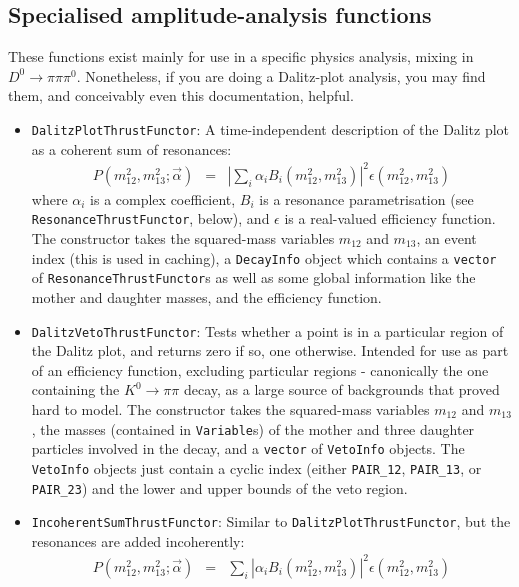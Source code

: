 \documentclass[12pt,pdflatex]{article}
\begin{document}
\subsection{Specialised amplitude-analysis functions}

These functions exist mainly for use in a specific
physics analysis, mixing in $D^0\to\pi\pi\pi^0$. Nonetheless, 
if you are doing a Dalitz-plot analysis, you may find them, and
conceivably even this documentation, helpful. 

\begin{itemize}
\item \texttt{DalitzPlotThrustFunctor}: A time-independent description
of the Dalitz plot as a coherent sum of resonances:
\begin{eqnarray}
P(m^2_{12},m^2_{13};\vec\alpha) &=& \left|\sum\limits_i \alpha_i B_i(m^2_{12},m^2_{13})\right|^2\epsilon(m^2_{12},m^2_{13})
\end{eqnarray}
where $\alpha_i$ is a complex coefficient, $B_i$ is a resonance parametrisation (see \texttt{ResonanceThrustFunctor}, below),
and $\epsilon$ is a real-valued efficiency function. The constructor takes the squared-mass variables $m_{12}$ and
$m_{13}$, an event index (this is used in caching), a \texttt{DecayInfo} object which contains a \texttt{vector}
of \texttt{ResonanceThrustFunctor}s as well as some global information like the mother and daughter masses, 
and the efficiency function. 
\item \texttt{DalitzVetoThrustFunctor}: Tests whether a point is in a particular 
region of the Dalitz plot, and returns zero if so, one otherwise. Intended for
use as part of an efficiency function, excluding particular regions - canonically
the one containing the  $K^0\to\pi\pi$ decay, as a large source of backgrounds that
proved hard to model. The constructor takes the squared-mass variables $m_{12}$ and
$m_{13}$, the masses (contained in \texttt{Variable}s) of the mother and three daughter
particles involved in the decay, and a \texttt{vector} of \texttt{VetoInfo} objects.
The \texttt{VetoInfo} objects just contain a cyclic index (either \texttt{PAIR\_12},
\texttt{PAIR\_13}, or \texttt{PAIR\_23}) and the lower and upper bounds of the veto region.
\item \texttt{IncoherentSumThrustFunctor}: Similar to \texttt{DalitzPlotThrustFunctor}, 
but the resonances are added incoherently:
\begin{eqnarray}
P(m^2_{12},m^2_{13};\vec\alpha) &=& \sum\limits_i \left|\alpha_i B_i(m^2_{12},m^2_{13})\right|^2\epsilon(m^2_{12},m^2_{13})

\end{eqnarray}
\end{itemize}
\end{document}
